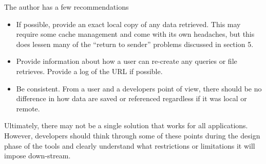 The author has a few recommendations

\begin{itemize}

\item  If possible, provide an exact local copy of any data retrieved. This may require some cache management and come with its own headaches, but this does lessen many of the ``return to sender'' problems discussed in section 5.

\item Provide information about how a user can re-create any queries or file retrieves.  Provide a log of the URL if possible.

\item Be consistent.  From a user and a developers point of view, there should be no difference in how data are saved or referenced regardless if it was local or remote.

\end{itemize}

Ultimately, there may not be a single solution that works for all applications. However, developers should think through some of these points during the design phase of the tools and clearly understand what restrictions or limitations it will impose down-stream.




